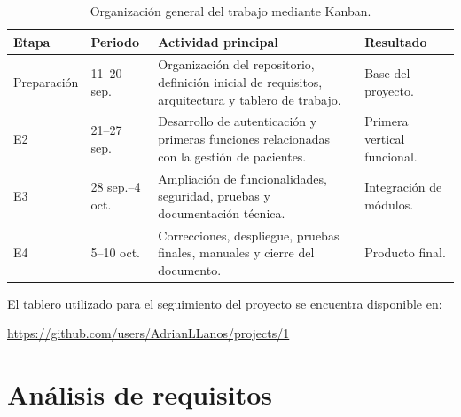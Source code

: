 \begin{table}[H]
	\centering
	\small
	
	\begin{tabularx}{\textwidth}
		{|L{2.3cm}|L{2.5cm}|Y|L{2.5cm}|}
		
		\hline
		
		\textbf{Etapa} &
		\textbf{Periodo} &
		\textbf{Actividad principal} &
		\textbf{Resultado}
		\\ \hline
		
		Preparación &
		11--20 sep. &
		Organización del repositorio, definición inicial de requisitos,
		arquitectura y tablero de trabajo. &
		Base del proyecto.
		\\ \hline
		
		E2 &
		21--27 sep. &
		Desarrollo de autenticación y primeras funciones relacionadas con
		la gestión de pacientes. &
		Primera vertical funcional.
		\\ \hline
		
		E3 &
		28 sep.--4 oct. &
		Ampliación de funcionalidades, seguridad, pruebas y documentación
		técnica. &
		Integración de módulos.
		\\ \hline
		
		E4 &
		5--10 oct. &
		Correcciones, despliegue, pruebas finales, manuales y cierre del
		documento. &
		Producto final.
		\\ \hline
		
	\end{tabularx}
	
	\caption{Organización general del trabajo mediante Kanban.
		\fuentepropia}
	
\end{table}

El tablero utilizado para el seguimiento del proyecto se encuentra
disponible en:

\begin{center}
	\url{https://github.com/users/AdrianLLanos/projects/1}
\end{center}

%



\section{Análisis de requisitos}


